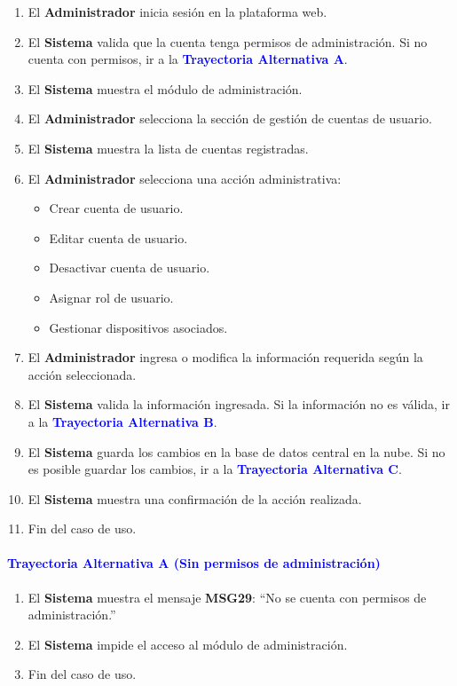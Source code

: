 \begin{enumerate}
    \item El \textbf{Administrador} inicia sesión en la plataforma web.
    \item El \textbf{Sistema} valida que la cuenta tenga permisos de administración.
    Si no cuenta con permisos, ir a la \textbf{\textcolor{blue}{Trayectoria Alternativa A}}.
    \item El \textbf{Sistema} muestra el módulo de administración.
    \item El \textbf{Administrador} selecciona la sección de gestión de cuentas de usuario.
    \item El \textbf{Sistema} muestra la lista de cuentas registradas.
    \item El \textbf{Administrador} selecciona una acción administrativa:
    \begin{itemize}
        \item Crear cuenta de usuario.
        \item Editar cuenta de usuario.
        \item Desactivar cuenta de usuario.
        \item Asignar rol de usuario.
        \item Gestionar dispositivos asociados.
    \end{itemize}
    \item El \textbf{Administrador} ingresa o modifica la información requerida según la acción seleccionada.
    \item El \textbf{Sistema} valida la información ingresada.
    Si la información no es válida, ir a la \textbf{\textcolor{blue}{Trayectoria Alternativa B}}.
    \item El \textbf{Sistema} guarda los cambios en la base de datos central en la nube.
    Si no es posible guardar los cambios, ir a la \textbf{\textcolor{blue}{Trayectoria Alternativa C}}.
    \item El \textbf{Sistema} muestra una confirmación de la acción realizada.
    \item Fin del caso de uso.
\end{enumerate}

\paragraph{\textbf{\textcolor{blue}{Trayectoria Alternativa A (Sin permisos de administración)}}}
\begin{enumerate}
    \item El \textbf{Sistema} muestra el mensaje \textbf{MSG29}: ``No se cuenta con permisos de administración.''
    \item El \textbf{Sistema} impide el acceso al módulo de administración.
    \item Fin del caso de uso.
\end{enumerate}


